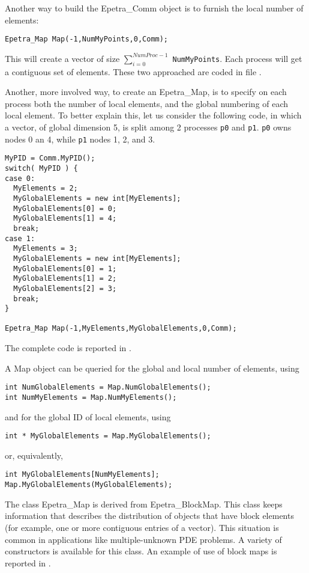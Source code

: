 Another way to build the Epetra\_Comm object is to furnish the local
number of elements:
\begin{verbatim}
Epetra_Map Map(-1,NumMyPoints,0,Comm);
\end{verbatim}
This will create a vector of size $\sum_{i=0}^{NumProc-1}$
\verb!NumMyPoints!. Each process will get a contiguous set of elements.
These two approached are coded in file .

Another, more involved way, to create an Epetra\_Map, is to specify on
each process both the number of local elements, and the global numbering
of each local element. To better explain this, let us consider the
following code, in which a vector, of global dimension 5, is split among
2 processes \verb!p0! and \verb!p1!. \verb!p0! owns nodes 0 an 4, while
\verb!p1! nodes 1, 2, and 3.
\begin{verbatim}
MyPID = Comm.MyPID();
switch( MyPID ) {
case 0:
  MyElements = 2;
  MyGlobalElements = new int[MyElements];
  MyGlobalElements[0] = 0;
  MyGlobalElements[1] = 4;
  break;
case 1:
  MyElements = 3;
  MyGlobalElements = new int[MyElements];
  MyGlobalElements[0] = 1;
  MyGlobalElements[1] = 2;
  MyGlobalElements[2] = 3;
  break;
}

Epetra_Map Map(-1,MyElements,MyGlobalElements,0,Comm);
\end{verbatim}
The complete code is reported in .

A Map object can be queried for the global and local number of elements,
using
\begin{verbatim}
int NumGlobalElements = Map.NumGlobalElements();
int NumMyElements = Map.NumMyElements();
\end{verbatim}
and for the global ID of local elements, using
\begin{verbatim}
int * MyGlobalElements = Map.MyGlobalElements();
\end{verbatim}
or, equivalently,
\begin{verbatim}
int MyGlobalElements[NumMyElements];
Map.MyGlobalElements(MyGlobalElements);
\end{verbatim}

\bigskip

The class Epetra\_Map is derived from Epetra\_BlockMap. This class keeps
information that describes the distribution of objects that have block
elements (for example, one or more contiguous entries of a vector). This
situation is common in applications like multiple-unknown PDE problems.
A variety of constructors is available for this class. An example of use
of block maps is reported in .

